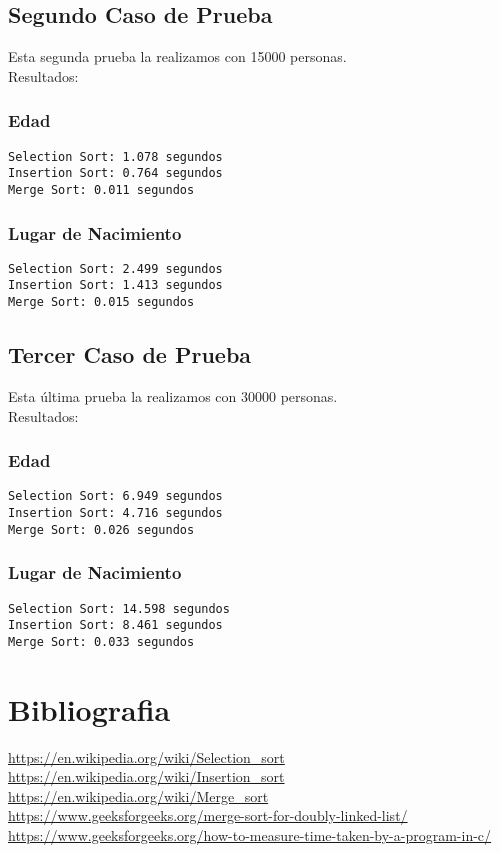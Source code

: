 \documentclass[]{article}
\begin{document}
\subsection{Segundo Caso de Prueba}
Esta segunda prueba la realizamos con 15000 personas.\\
Resultados:

\subsubsection{Edad}
\verb|Selection Sort: 1.078 segundos|\\
\verb|Insertion Sort: 0.764 segundos|\\
\verb|Merge Sort: 0.011 segundos|\\
\subsubsection{Lugar de Nacimiento}
\verb|Selection Sort: 2.499 segundos|\\
\verb|Insertion Sort: 1.413 segundos|\\
\verb|Merge Sort: 0.015 segundos|\\

\subsection{Tercer Caso de Prueba}
Esta última prueba la realizamos con 30000 personas.\\
Resultados:

\subsubsection{Edad}
\verb|Selection Sort: 6.949 segundos|\\
\verb|Insertion Sort: 4.716 segundos|\\
\verb|Merge Sort: 0.026 segundos|\\
\subsubsection{Lugar de Nacimiento}
\verb|Selection Sort: 14.598 segundos|\\
\verb|Insertion Sort: 8.461 segundos|\\
\verb|Merge Sort: 0.033 segundos|\\
\section{Bibliografia}
\url{https://en.wikipedia.org/wiki/Selection_sort}\\
\url{https://en.wikipedia.org/wiki/Insertion_sort}\\
\url{https://en.wikipedia.org/wiki/Merge_sort}\\
\url{https://www.geeksforgeeks.org/merge-sort-for-doubly-linked-list/}\\
\url{https://www.geeksforgeeks.org/how-to-measure-time-taken-by-a-program-in-c/}\\
\end{document}
